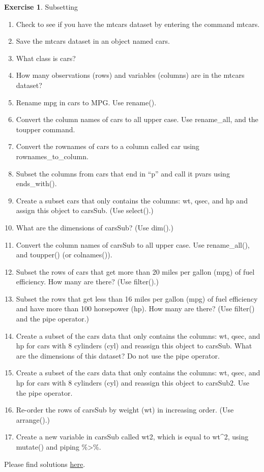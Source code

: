 \documentclass[
  12pt,
  oneside]{book}
\providecommand{\tightlist}{%
  \setlength{\itemsep}{0pt}\setlength{\parskip}{0pt}}
\theoremstyle{definition}
\theoremstyle{definition}
\theoremstyle{definition}
\newtheorem{exercise}{Exercise}[chapter]
\theoremstyle{definition}
\theoremstyle{remark}
\begin{document}
\begin{exercise}
\protect\hypertarget{exr:subsetting}{}\label{exr:subsetting}Subsetting

\begin{enumerate}
\def\labelenumi{\arabic{enumi}.}
\tightlist
\item
  Check to see if you have the mtcars dataset by entering the command mtcars.
\item
  Save the mtcars dataset in an object named cars.
\item
  What class is cars?
\item
  How many observations (rows) and variables (columns) are in the mtcars dataset?
\item
  Rename mpg in cars to MPG. Use rename().
\item
  Convert the column names of cars to all upper case. Use rename\_all, and the toupper command.
\item
  Convert the rownames of cars to a column called car using rownames\_to\_column.
\item
  Subset the columns from cars that end in ``p'' and call it pvars using ends\_with().
\item
  Create a subset cars that only contains the columns: wt, qsec, and hp and assign this object to carsSub. (Use select().)
\item
  What are the dimensions of carsSub? (Use dim().)
\item
  Convert the column names of carsSub to all upper case. Use rename\_all(), and toupper() (or colnames()).
\item
  Subset the rows of cars that get more than 20 miles per gallon (mpg) of fuel efficiency. How many are there? (Use filter().)
\item
  Subset the rows that get less than 16 miles per gallon (mpg) of fuel efficiency and have more than 100 horsepower (hp). How many are there? (Use filter() and the pipe operator.)
\item
  Create a subset of the cars data that only contains the columns: wt, qsec, and hp for cars with 8 cylinders (cyl) and reassign this object to carsSub. What are the dimensions of this dataset? Do not use the pipe operator.
\item
  Create a subset of the cars data that only contains the columns: wt, qsec, and hp for cars with 8 cylinders (cyl) and reassign this object to carsSub2. Use the pipe operator.
\item
  Re-order the rows of carsSub by weight (wt) in increasing order. (Use arrange().)
\item
  Create a new variable in carsSub called wt2, which is equal to wt\^{}2, using mutate() and piping \%\textgreater\%.
\end{enumerate}

Please find solutions \href{https://raw.githubusercontent.com/hubchev/courses/main/scr/exe_subset.R}{here}.
\end{exercise}
\end{document}
